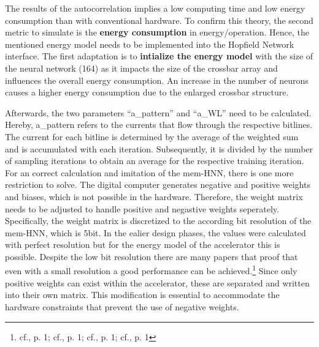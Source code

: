 The results of the autocorrelation implies a low computing time and low energy consumption than with conventional hardware.
To confirm this theory, the second metric to simulate is the \textbf{energy consumption} in energy/operation. 
Hence, the mentioned energy model needs to be implemented into the Hopfield Network interface.
The first adaptation is to \textbf{intialize the energy model} with the size of the neural network (164) as it impacts the size of the crossbar array and influences the overall energy consumption.
An increase in the number of neurons causes a higher energy consumption due to the enlarged crossbar structure.

Afterwards, the two parameters ``a\_pattern'' and ``a\_WL'' need to be calculated.
Hereby, a\_pattern refers to the currents that flow through the respective bitlines.
The current for each bitline is determined by the average of the weighted sum and is accumulated with each iteration.
Subsequently, it is divided by the number of sampling iterations to obtain an average for the respective training iteration.
For an correct calculation and imitation of the \ac{mem-HNN}, there is one more restriction to solve. 
The digital computer generates negative and positive weights and biases, which is not possible in the hardware.
Therefore, the weight matrix needs to be adjusted to handle positive and negastive weights seperately. 
Specifically, the weight matrix is discretized to the according bit resolution of the \ac{mem-HNN}, which is 5bit.
In the ealier design phases, the values were calculated with perfect resolution but for the energy model of the accelerator this is possible. 
Despite the low bit resolution there are many papers that proof that even with a small resolution a good performance can be achieved.\footnote{cf.\cite{maEra1bitLLMs2024}, p. 1; cf.\cite{GitHubHtqinQuantSR}, p. 1; cf.\cite{rouhaniMicroscalingDataFormats2023}, p. 1; cf.\cite{rouhaniSharedMicroexponentsLittle2023}, p. 1}
Since only positive weights can exist within the accelerator, these are separated and written into their own matrix.
This modification is essential to accommodate the hardware constraints that prevent the use of negative weights.

